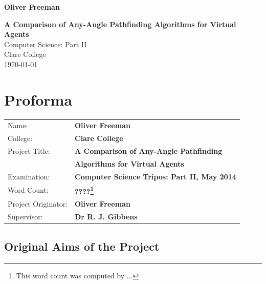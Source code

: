 \documentclass[12pt,notitlepage]{report}
\begin{document}


\pagestyle{empty}

\hfill{\LARGE \bf Oliver Freeman}

\vspace*{60mm}
\begin{center}
\Huge
{\bf A Comparison of Any-Angle Pathfinding Algorithms for Virtual Agents} \\
\vspace*{5mm}
Computer Science: Part II \\
\vspace*{5mm}
Clare College \\
\vspace*{5mm}
\today  %
\end{center}

\cleardoublepage


\setcounter{page}{1}
\pagestyle{plain}

\chapter*{Proforma}

{\large
\begin{tabular}{ll}
Name:               & \bf Oliver Freeman                      \\
College:            & \bf Clare College                    \\
Project Title:      & \bf A Comparison of Any-Angle Pathfinding\\ 
                    & \bf Algorithms for Virtual Agents \\
Examination:        & \bf Computer Science Tripos: Part II, May 2014        \\
Word Count:         & \bf ????\footnote{This word count was computed by ...}  \\
Project Originator: & \bf Oliver Freeman                   \\
Supervisor:         & \bf Dr R. J. Gibbens                   \\ 
\end{tabular}
}


\section*{Original Aims of the Project}
\end{document}
